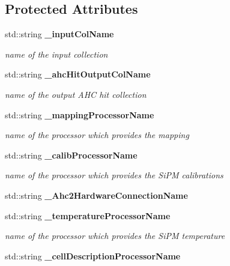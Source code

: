 \subsection*{Protected Attributes}
\begin{DoxyCompactItemize}
\item 
std::string {\bf \_\-inputColName}\label{classCALICE_1_1Ahc2CalibrateProcessor_af40da80c07919fd7ff11c2eea1aeb381}

\begin{DoxyCompactList}\small\item\em name of the input collection \item\end{DoxyCompactList}\item 
std::string {\bf \_\-ahcHitOutputColName}\label{classCALICE_1_1Ahc2CalibrateProcessor_a3dc06786436feb1670498da3fd69ad94}

\begin{DoxyCompactList}\small\item\em name of the output AHC hit collection \item\end{DoxyCompactList}\item 
std::string {\bf \_\-mappingProcessorName}\label{classCALICE_1_1Ahc2CalibrateProcessor_ac8d1b19a0ffa72a6ea1427664503921d}

\begin{DoxyCompactList}\small\item\em name of the processor which provides the mapping \item\end{DoxyCompactList}\item 
std::string {\bf \_\-calibProcessorName}\label{classCALICE_1_1Ahc2CalibrateProcessor_ae410aaaebdd65ba4054169c41266154e}

\begin{DoxyCompactList}\small\item\em name of the processor which provides the SiPM calibrations \item\end{DoxyCompactList}\item 
std::string {\bfseries \_\-Ahc2HardwareConnectionName}\label{classCALICE_1_1Ahc2CalibrateProcessor_a58a404a600c53c93f2a8d93cdd3d0bdd}

\item 
std::string {\bf \_\-temperatureProcessorName}\label{classCALICE_1_1Ahc2CalibrateProcessor_acb920d14fbddb7869a6563c9b8e0591d}

\begin{DoxyCompactList}\small\item\em name of the processor which provides the SiPM temperature \item\end{DoxyCompactList}\item 
std::string {\bf \_\-cellDescriptionProcessorName}\label{classCALICE_1_1Ahc2CalibrateProcessor_abb12c048f5ca0a876f4112580dcd790e}


\end{DoxyCompactItemize}
